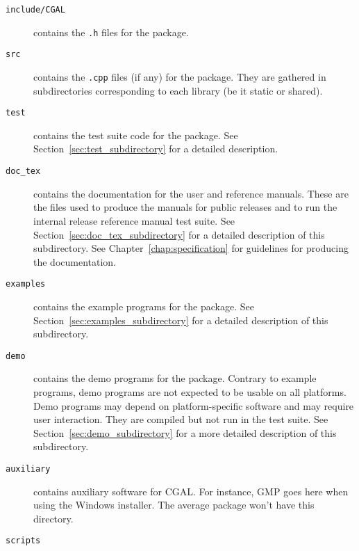 \begin{description}
  \item[{\tt include/CGAL}]
       contains the {\tt .h} files for the package.
  \item[{\tt src}]
       contains the {\tt .cpp} files (if any) for the package.
       They are gathered in subdirectories corresponding to each
       library (be it static or shared).
  \item[{\tt test}] contains the test suite code for the package. See
       Section~\ref{sec:test_subdirectory} for a detailed description.
  \item[{\tt doc\_tex}]
       contains the documentation for the user and reference manuals.
       These are the files used to produce the manuals for public releases and
       to run the internal release reference manual test suite.
       See Section~\ref{sec:doc_tex_subdirectory} for a detailed description 
       of this subdirectory.
       See Chapter~\ref{chap:specification} for guidelines for producing
       the documentation.
  \item[{\tt examples}]
       contains the example programs for the package.
       See Section~\ref{sec:examples_subdirectory} for a detailed 
       description of this subdirectory.
  \item[{\tt demo}]
       contains the demo programs for the package.
       Contrary to example programs, demo programs are not expected to be
       usable on all platforms. Demo programs may depend on platform-specific
       software and may require user interaction.  They are compiled but not
       run in the test suite. See Section~\ref{sec:demo_subdirectory} for a
       more detailed description of this subdirectory.
  \item[{\tt auxiliary}] contains auxiliary software for CGAL. For
       instance, GMP goes here when using the Windows installer.
       The average package won't have this directory.
  \item[{\tt scripts}]
\end{description}
